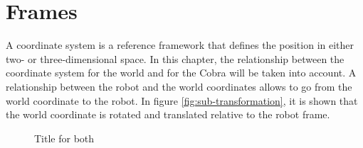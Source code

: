 \chapter{Frames}\label{ch:frames}
A coordinate system is a reference framework that defines the position in either two- or three-dimensional space. In this chapter, the relationship between the coordinate system for the world and for the Cobra will be taken into account. A relationship between the robot and the world coordinates allows to go from the world coordinate to the robot. In figure \ref{fig:sub-transformation}, it is shown that the world coordinate is rotated and translated relative to the robot frame. 

\begin{figure}[hb]
\hfill
{}
\hfill
{}
\hfill
\caption{Title for both}
\end{figure}

